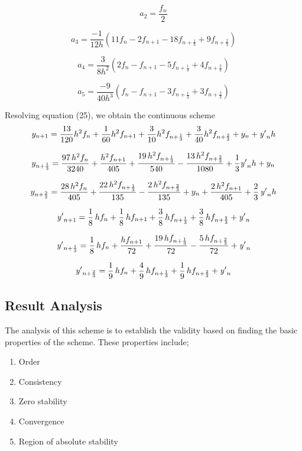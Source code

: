 \documentclass[12pt]{article}
\begin{document}
$$a_2 = \frac{f_n}{2}$$

$$a_3 = \frac{-1}{12h}\left(11f_n-2f_{n+1}-18f_{n+\frac{1}{3}}+9f_{n+\frac{2}{3}}\right)$$

$$a_4 = \frac{3}{8h^2}\left(2f_n-f_{n+1}-5f_{n+\frac{1}{3}}+4f_{n+\frac{2}{3}}\right)$$


$$a_5 = \frac{-9}{40h^3}\left(f_n-f_{n+1}-3f_{n+\frac{1}{3}}+3f_{n+\frac{2}{3}}\right)$$






\noindent Resolving equation (25), we obtain the continuous scheme
$$y_{{n+1}}=\frac {13}{120}{h}^{2}f_{{n}}+\frac{1}{60} {{h}^{2}f_{{n+1}}}+\frac{3}{10}h^{2}f_{{n+\frac{1}{3}}}+\frac{3}{40}h^2f_{{n+\frac{2}{3}}}+y_{{
		n}}+{\it y'}_{{n}}h$$

$$y_{{n+\frac{1}{3}}}={\frac{97\,{h}^{2}f_{{n}}}{3240}}+{\frac{{h}^{2}f_{{n+1}}}{405}}+{\frac{19\,{h}^{2}f_{{n+\frac{1}{3}}}}{540}}-{\frac{13\,{h}^{2}f_{{n+\frac{2}{3}}}}{1080}}+\frac{1}{3}{\it y'}_{{n}}h+y_{{n}}$$

$$y_{{n+\frac{2}{3}}}={\frac{28\,{h}^{2}f_{{n}}}{405}}+{\frac{22\,{h}^{2}f_{{n+\frac{1}{3}}}}{135}}-{\frac{2\,{h}^{2}f_{{n+\frac{2}{3}}}}{135}}+y_{{n}}+{\frac{2\,{h}^{2}f_{{n+1}}}{405}}+\frac{2}{3}\,{\it y'}_{{n}}h$$

$${\it y'}_{{n+1}}=\frac{1}{8}\,hf_{{n}}+\frac{1}{8}\,hf_{{n+1}}+\frac{3}{8}\,hf_{{n+\frac{1}{3}}}+\frac{3}{8}\,hf_{{n+\frac{2}{3}}}+{\it y'}_{{n}}$$

$${\it y'}_{{n+\frac{1}{3}}}=\frac{1}{8}\,hf_{{n}}+{\frac{hf_{{n+1}}}{72}}+{\frac{19\,hf_{{n+\frac{1}{3}}}}{72}}-{\frac {5\,hf_{{n+\frac{2}{3}}}}{72}}+{\it y'}_{{n}}$$

$${\it y'}_{{n+\frac{2}{3}}}=\frac{1}{9}\,hf_{{n}}+\frac{4}{9}\,hf_{{n+\frac{1}{3}}}+\frac{1}{9}\,hf_{{n+\frac{2}{3}}}+{\it y'}_{{n}}$$



\subsection{Result Analysis}
\noindent The analysis of this scheme is to establish the validity based on finding the basic properties of the scheme. These properties include;
\begin{enumerate}
	\item Order
	\item Consistency
	\item Zero stability
	\item Convergence
	\item Region of absolute stability
\end{enumerate}
\end{document}
